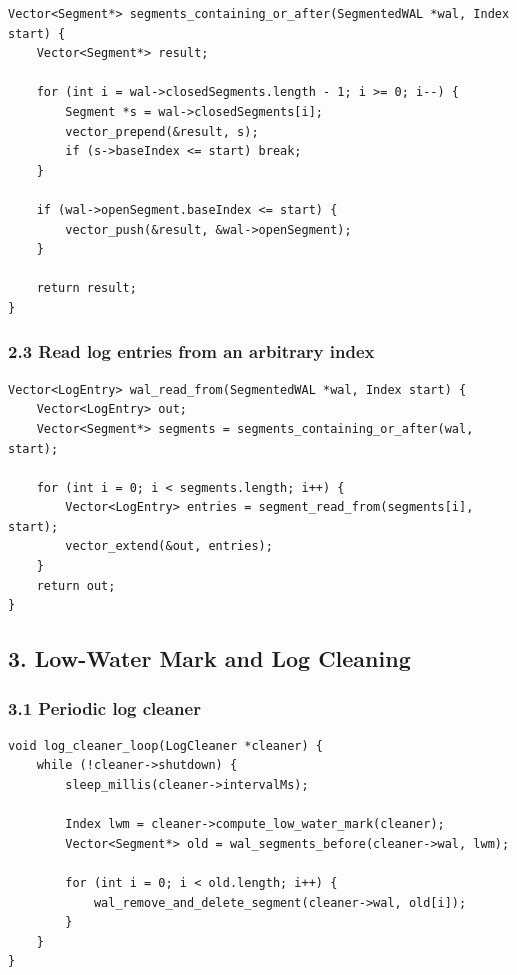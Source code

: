 \documentclass[10pt,letterpaper]{article}
\begin{document}
\begin{verbatim}
Vector<Segment*> segments_containing_or_after(SegmentedWAL *wal, Index start) {
    Vector<Segment*> result;

    for (int i = wal->closedSegments.length - 1; i >= 0; i--) {
        Segment *s = wal->closedSegments[i];
        vector_prepend(&result, s);
        if (s->baseIndex <= start) break;
    }

    if (wal->openSegment.baseIndex <= start) {
        vector_push(&result, &wal->openSegment);
    }

    return result;
}
\end{verbatim}

\subsubsection*{2.3 Read log entries from an arbitrary index}

\begin{verbatim}
Vector<LogEntry> wal_read_from(SegmentedWAL *wal, Index start) {
    Vector<LogEntry> out;
    Vector<Segment*> segments = segments_containing_or_after(wal, start);

    for (int i = 0; i < segments.length; i++) {
        Vector<LogEntry> entries = segment_read_from(segments[i], start);
        vector_extend(&out, entries);
    }
    return out;
}
\end{verbatim}

\subsection*{3. Low-Water Mark and Log Cleaning}

\subsubsection*{3.1 Periodic log cleaner}

\begin{verbatim}
void log_cleaner_loop(LogCleaner *cleaner) {
    while (!cleaner->shutdown) {
        sleep_millis(cleaner->intervalMs);

        Index lwm = cleaner->compute_low_water_mark(cleaner);
        Vector<Segment*> old = wal_segments_before(cleaner->wal, lwm);

        for (int i = 0; i < old.length; i++) {
            wal_remove_and_delete_segment(cleaner->wal, old[i]);
        }
    }
}
\end{verbatim}
\end{document}
